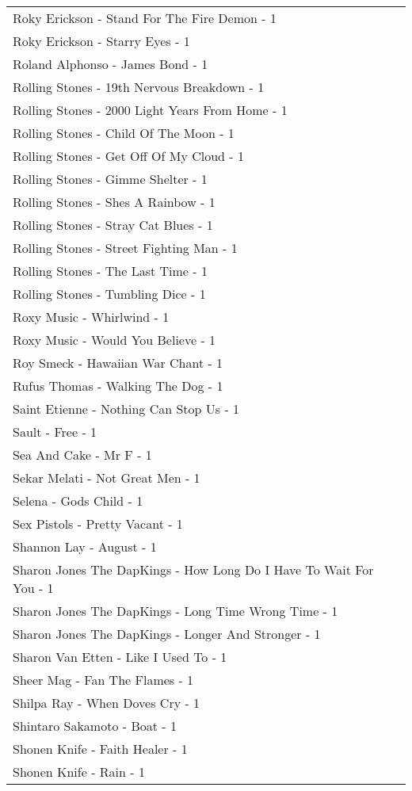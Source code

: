 \documentclass[
]{article}
\begin{document}
\begin{longtable}{l}
Roky Erickson - Stand For The Fire Demon - 1 \\ 
Roky Erickson - Starry Eyes - 1 \\ 
Roland Alphonso - James Bond - 1 \\ 
Rolling Stones - 19th Nervous Breakdown - 1 \\ 
Rolling Stones - 2000 Light Years From Home - 1 \\ 
Rolling Stones - Child Of The Moon - 1 \\ 
Rolling Stones - Get Off Of My Cloud - 1 \\ 
Rolling Stones - Gimme Shelter - 1 \\ 
Rolling Stones - Shes A Rainbow - 1 \\ 
Rolling Stones - Stray Cat Blues - 1 \\ 
Rolling Stones - Street Fighting Man - 1 \\ 
Rolling Stones - The Last Time - 1 \\ 
Rolling Stones - Tumbling Dice - 1 \\ 
Roxy Music - Whirlwind - 1 \\ 
Roxy Music - Would You Believe - 1 \\ 
Roy Smeck - Hawaiian War Chant - 1 \\ 
Rufus Thomas - Walking The Dog - 1 \\ 
Saint Etienne - Nothing Can Stop Us - 1 \\ 
Sault - Free - 1 \\ 
Sea And Cake - Mr F - 1 \\ 
Sekar Melati - Not Great Men - 1 \\ 
Selena - Gods Child - 1 \\ 
Sex Pistols - Pretty Vacant - 1 \\ 
Shannon Lay - August - 1 \\ 
Sharon Jones The DapKings - How Long Do I Have To Wait For You - 1 \\ 
Sharon Jones The DapKings - Long Time Wrong Time - 1 \\ 
Sharon Jones The DapKings - Longer And Stronger - 1 \\ 
Sharon Van Etten - Like I Used To - 1 \\ 
Sheer Mag - Fan The Flames - 1 \\ 
Shilpa Ray - When Doves Cry - 1 \\ 
Shintaro Sakamoto - Boat - 1 \\ 
Shonen Knife - Faith Healer - 1 \\ 
Shonen Knife - Rain - 1 \\ 

\end{longtable}
\end{document}
